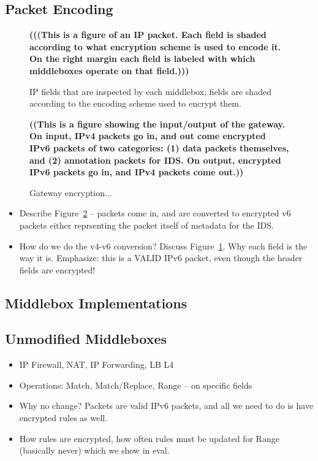 \subsection{Packet Encoding}
\begin{figure}[t]
  {\bf (((This is a figure of an IP packet. Each field is shaded according to what encryption scheme is used to encode it. On the right margin each field is labeled with which middleboxes operate on that field.)))}
  \caption[]{\label{fig:packet} IP fields that are inspected by each middlebox; fields are shaded according to the encoding scheme used to encrypt them.}
\end{figure}

\begin{figure}[t]
  {\bf ((This is a figure showing the input/output of the gateway. On input, IPv4 packets go in, and out come encrypted IPv6 packets of two categories: (1) data packets themselves, and (2) annotation packets for IDS. On output, encrypted IPv6 packets go in, and IPv4 packets come out.))} 
  \caption[]{\label{fig:gatewayops} Gateway encryption...}
\end{figure}

\begin{itemize}
  \item Describe Figure~\ref{fig:gatewayops} -- packets come in, and are converted to encrypted v6 packets either reprsenting the packet itself of metadata for the IDS.
  \item How do we do the v4-v6 conversion? Discuss Figure~\ref{fig:packet}. Why each field is the way it is. Emphasize: this is a VALID IPv6 packet, even though the header fields are encrypted!
\end{itemize}

\subsection{Middlebox Implementations}

\subsection{Unmodified Middleboxes}
\begin{itemize}
  \item IP Firewall, NAT, IP Forwarding, LB L4
  \item Operations: Match, Match/Replace, Range -- on specific fields
  \item Why no change? Packets are valid IPv6 packets, and all we need to do is have encrypted rules as well.
  \item How rules are encrypted, how often rules must be updated for Range (basically never) which we show in eval.
\end{itemize}

